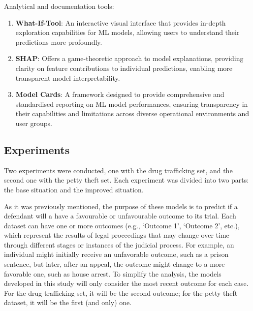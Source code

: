 \documentclass[fleqn,10pt]{wlscirep}
\begin{document}
Analytical and documentation tools:

\begin{enumerate}
    \item \textbf{What-If-Tool}: An interactive visual interface that provides in-depth exploration capabilities for ML models, allowing users to understand their predictions more profoundly.
    
    \item \textbf{SHAP}: Offers a game-theoretic approach to model explanations, providing clarity on feature contributions to individual predictions, enabling more transparent model interpretability.
    
    \item \textbf{Model Cards}: A framework designed to provide comprehensive and standardised reporting on ML model performances, ensuring transparency in their capabilities and limitations across diverse operational environments and user groups.
\end{enumerate}

\subsection{Experiments}

Two experiments were conducted, one with the drug trafficking set, and the second one with the petty theft set. Each experiment was divided into two parts: the base situation and the improved situation.

As it was previously mentioned, the purpose of these models is to predict if a defendant will a have a favourable or unfavourable outcome to its trial. Each dataset can have one or more outcomes (e.g., ‘Outcome 1’, ‘Outcome 2’, etc.), which represent the results of legal proceedings that may change over time through different stages or instances of the judicial process. For example, an individual might initially receive an unfavorable outcome, such as a prison sentence, but later, after an appeal, the outcome might change to a more favorable one, such as house arrest. To simplify the analysis, the models developed in this study will only consider the most recent outcome for each case. For the drug trafficking set, it will be the second outcome; for the petty theft dataset, it will be the first (and only) one.
\end{document}
